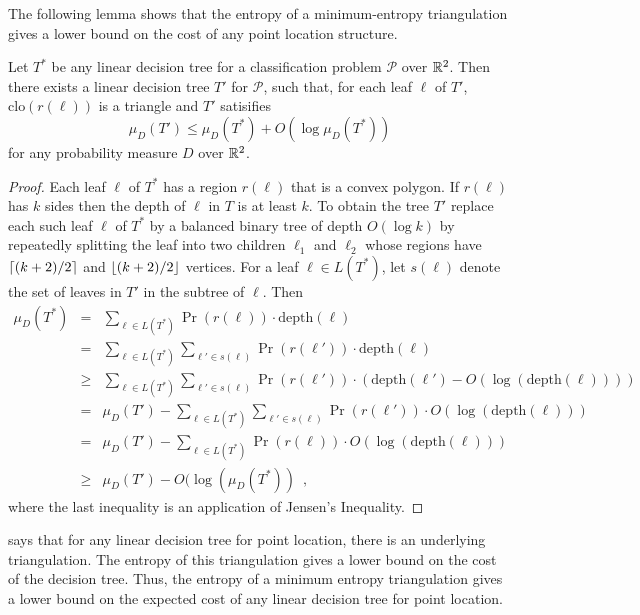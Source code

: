 \documentclass[lotsofwhite]{patmorin}
\newcommand{\closure}{\mathrm{clo}}
\newcommand{\depth}{\mathrm{depth}}
\begin{document}
The following lemma shows that the entropy of a minimum-entropy
triangulation gives a lower bound on the cost of any point location
structure.

\begin{lem}
Let $T^*$ be any linear decision tree for a classification problem
$\mathcal{P}$ over $\mathbb{R}^2$.  Then there exists a linear decision tree
$T'$ for $\mathcal{P}$, such that, for each leaf $\ell$ of $T'$,
$\closure(r(\ell))$ is a triangle and $T'$ satisifies
\[
    \mu_D(T') \le \mu_D(T^*) + O(\log\mu_D(T^*))
\]
for any probability measure $D$ over $\mathbb{R}^2$.
\end{lem}

\begin{proof}
Each leaf $\ell$ of $T^*$ has a region $r(\ell)$ that is a convex
polygon.  If $r(\ell)$ has $k$ sides then the depth of $\ell$ in $T$
is at least $k$.  To obtain the tree $T'$ replace each such leaf
$\ell$ of $T^*$ by a balanced binary tree of depth $O(\log k)$ by
repeatedly splitting the leaf into two children $\ell_1$ and $\ell_2$
whose regions have ${\left\lceil (k+2)/2 \right\rceil}$ and ${\left\lfloor (k+2)/2 \right\rfloor}$ vertices.
For a leaf $\ell\in L(T^*)$, let $s(\ell)$ denote the set of leaves in $T'$
in the subtree of $\ell$.   Then
\begin{eqnarray*}
   \mu_D(T^*) 
     &  =  & \sum_{\ell\in L(T^*)} \Pr(r(\ell))\cdot \depth(\ell) \\
     &  =  & \sum_{\ell\in L(T^*)}\sum_{\ell'\in s(\ell)} 
              \Pr(r(\ell'))\cdot \depth(\ell) \\
     & \ge & \sum_{\ell\in L(T^*)} 
             \sum_{\ell'\in s(\ell)}\Pr(r(\ell'))\cdot (\depth(\ell')
                   - O(\log (\depth(\ell)))) \\
     &  =  & \mu_D(T') - \sum_{\ell\in L(T^*)} 
             \sum_{\ell'\in s(\ell)}\Pr(r(\ell'))\cdot O(\log (\depth(\ell))) \\
     &  =  & \mu_D(T') - \sum_{\ell\in L(T^*)} 
             \Pr(r(\ell))\cdot O(\log (\depth(\ell))) \\
     & \ge & \mu_D(T') - O(\log(\mu_D(T^*)) \enspace , 
\end{eqnarray*}
where the last inequality is an application of Jensen's Inequality.
\end{proof}

 says that for any linear decision tree for point
location, there is an underlying triangulation.  The entropy of this
triangulation gives a lower bound on the cost of the decision tree.
Thus, the entropy of a minimum entropy triangulation gives a lower
bound on the expected cost of any linear decision tree for point
location.
\end{document}
